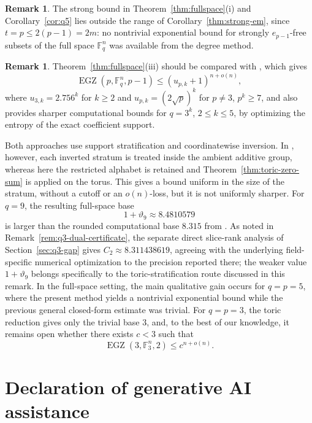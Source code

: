 \documentclass[10pt,a4paper]{amsart}
\theoremstyle{definition}
\newtheorem{remark}[theorem]{Remark}
\newcommand{\F}{\mathbb F}
\newcommand{\EGZ}{\operatorname{EGZ}}
\newcommand{\1}{\mathbf 1}
\begin{document}
\begin{remark}
The strong bound in Theorem~\ref{thm:fullspace}(i) and
Corollary~\ref{cor:q5} lies outside the range of Corollary~\ref{thm:strong-em},
since $t=p\leq 2(p-1)=2m$: no nontrivial exponential bound for strongly $e_{p-1}$-free subsets of
the full space $\F_q^n$ was available from the degree method.
\end{remark}

\begin{remark}\label{rem:comparison-previous}
Theorem~\ref{thm:fullspace}(iii) should be compared with
\cite[Theorem~4.3]{CostaDellaFiore}, which gives
\[
\EGZ(p,\F_q^n,p-1)\leq (u_{p,k}+1)^{n+o(n)},
\]
where $u_{3,k}=2.756^k$ for $k\geq2$ and
$u_{p,k}=(2\sqrt p)^k$ for $p\neq3$, $p^k\geq7$, and also provides sharper computational bounds for $q=3^k$, $2\leq k\leq5$, by optimizing the entropy of the exact coefficient support.

Both approaches use support stratification and coordinatewise inversion. In
\cite{CostaDellaFiore}, however, each inverted stratum is treated inside the ambient additive group, whereas here the restricted alphabet is retained and Theorem~\ref{thm:toric-zero-sum} is applied on the torus. This gives a bound uniform in the size of the stratum, without a cutoff or an $o(n)$-loss, but it is not uniformly sharper. For $q=9$, the resulting full-space base
\[
1+\vartheta_9\approx8.4810579
\]
is larger than the rounded computational base $8.315$ from
\cite{CostaDellaFiore}.  As noted in Remark~\ref{rem:q3-dual-certificate}, the separate direct slice-rank analysis of Section~\ref{sec:q3-gap} gives $C_2\approx8.311438619$, agreeing with the underlying field-specific numerical optimization to the precision reported there; the weaker value $1+\vartheta_9$ belongs specifically to the toric-stratification route discussed in this remark.  In the full-space setting, the main qualitative gain occurs for $q=p=5$, where the present method yields a nontrivial exponential bound while the previous general closed-form estimate was trivial.  For $q=p=3$, the toric reduction gives only the trivial base $3$, and, to the best of our knowledge, it remains open whether there exists $c<3$ such that
\[
 \EGZ(3,\F_3^n,2)\le c^{n+o(n)}.
\]
\end{remark}

\section*{Declaration of generative AI assistance}
\end{document}
